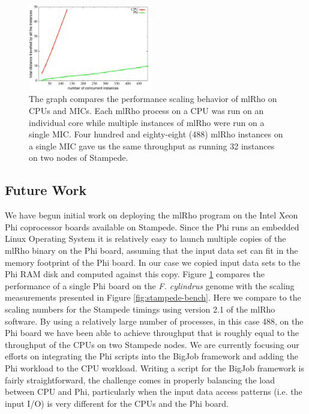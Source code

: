 \documentclass{sig-alternate}
\begin{document}
\begin{figure} %
\centering
\includegraphics[width=0.48\textwidth]{figures/mic-scaling.pdf}
\caption{The graph compares the performance scaling behavior of mlRho on CPUs and MICs. Each mlRho process on a CPU was run on an individual core while multiple instances of mlRho were run on a single MIC. Four hundred and eighty-eight (488) mlRho instances on a single MIC gave us the same throughput as running 32 instances on two nodes of Stampede.  }
\label{fig:mic-scaling}
\end{figure}

\subsection{Future Work}
We have begun initial work on deploying the mlRho program on the Intel Xeon Phi coprocessor boards
available on Stampede. Since the Phi runs an embedded Linux Operating System \cite{xeon_phi}
it is relatively easy to launch multiple copies of the mlRho binary on the Phi board, assuming
that the input data set can fit in the memory footprint of the Phi board. In our case we copied input data
sets to the Phi RAM disk and computed against this copy. Figure \ref{fig:mic-scaling} compares the performance
of a single Phi board on the {\it F. cylindrus} genome with the scaling measurements presented in Figure
\ref{fig:stampede-bench}. Here we compare to the scaling numbers for the Stampede timings using version 2.1 of
the mlRho software. By using a relatively large number of processes, in this case 488, on the Phi board
we have been able to achieve throughput that is roughly equal to the throughput of the CPUs on two Stampede
nodes. We are currently focusing our efforts on integrating the Phi scripts into the BigJob framework and
adding the Phi workload to the CPU workload. Writing a script for the BigJob framework is fairly
straightforward, the challenge comes in properly balancing the load between CPU and Phi, particularly when the
input data access patterns (i.e. the input I/O) is very different for the CPUs and the Phi board.
\end{document}
